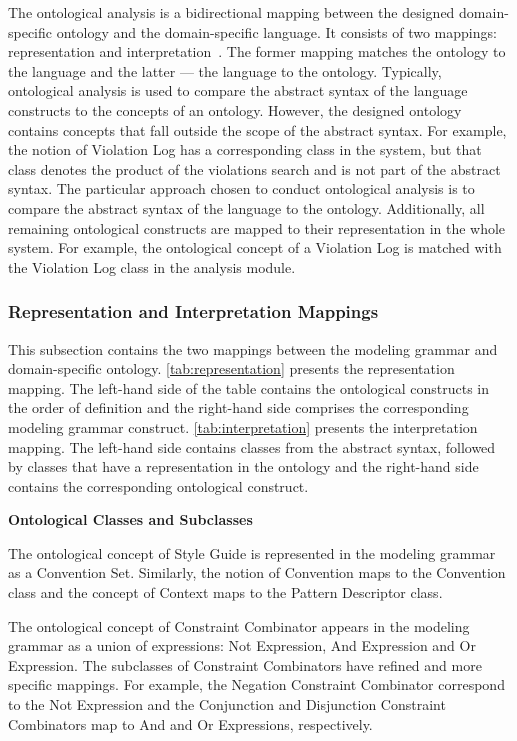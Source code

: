 The ontological analysis is a bidirectional mapping between the designed domain-specific ontology
and the domain-specific language. It consists of two mappings: representation and
interpretation~\cite{moody2009physics}. The former mapping matches the ontology to the language and
the latter --- the language to the ontology. Typically, ontological analysis is used to compare the
abstract syntax of the language constructs to the concepts of an ontology. However, the designed
ontology contains concepts that fall outside the scope of the abstract syntax. For example, the
notion of Violation Log has a corresponding class in the system, but that class denotes the
product of the violations search and is not part of the abstract syntax. The particular approach
chosen to conduct ontological analysis is to compare the abstract syntax of the language to the
ontology. Additionally, all remaining ontological constructs are mapped to their representation in
the whole system. For example, the ontological concept of a Violation Log is matched with the
Violation Log class in the analysis module.

\subsubsection{Representation and Interpretation Mappings} 

This subsection contains the two mappings between the modeling grammar and domain-specific ontology.
\autoref{tab:representation} presents the representation mapping. The left-hand side of the table
contains the ontological constructs in the order of definition and the right-hand side comprises the
corresponding modeling grammar construct. \autoref{tab:interpretation} presents the interpretation
mapping. The left-hand side contains classes from the abstract syntax, followed by classes that have
a representation in the ontology and the right-hand side contains the corresponding ontological
construct.




\textbf{Ontological Classes and Subclasses}

The ontological concept of Style Guide is represented in the modeling grammar as a Convention Set.
Similarly, the notion of Convention maps to the Convention class and the concept of Context maps to
the Pattern Descriptor class.

The ontological concept of Constraint Combinator appears in the modeling grammar as a union of
expressions: Not Expression, And Expression and Or Expression. The subclasses of Constraint
Combinators have refined and more specific mappings. For example, the Negation Constraint Combinator
correspond to the Not Expression and the Conjunction and Disjunction Constraint Combinators map to
And and Or Expressions, respectively.

